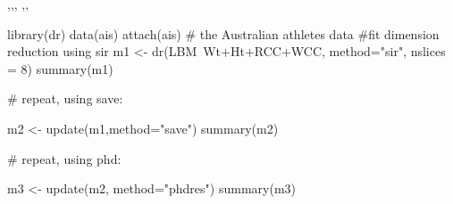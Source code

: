 \begin{SeeAlso}\relax
{},,,
,,
\end{SeeAlso}
\begin{Examples}
\begin{ExampleCode}
library(dr)
data(ais)
attach(ais)  # the Australian athletes data
#fit dimension reduction using sir
m1 <- dr(LBM~Wt+Ht+RCC+WCC, method="sir", nslices = 8)
summary(m1)

# repeat, using save:

m2 <- update(m1,method="save")
summary(m2)

# repeat, using phd:

m3 <- update(m2, method="phdres")
summary(m3)
\end{ExampleCode}
\end{Examples}

